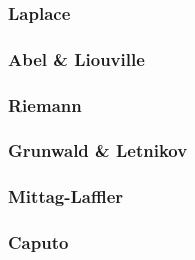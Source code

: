 \documentclass{unswmaths}
\begin{document}
\subsubsection{Laplace}
\subsubsection{Abel \& Liouville}
\subsubsection{Riemann}
\subsubsection{Grunwald \& Letnikov}
\subsubsection{Mittag-Laffler}
\subsubsection{Caputo}
\end{document}
